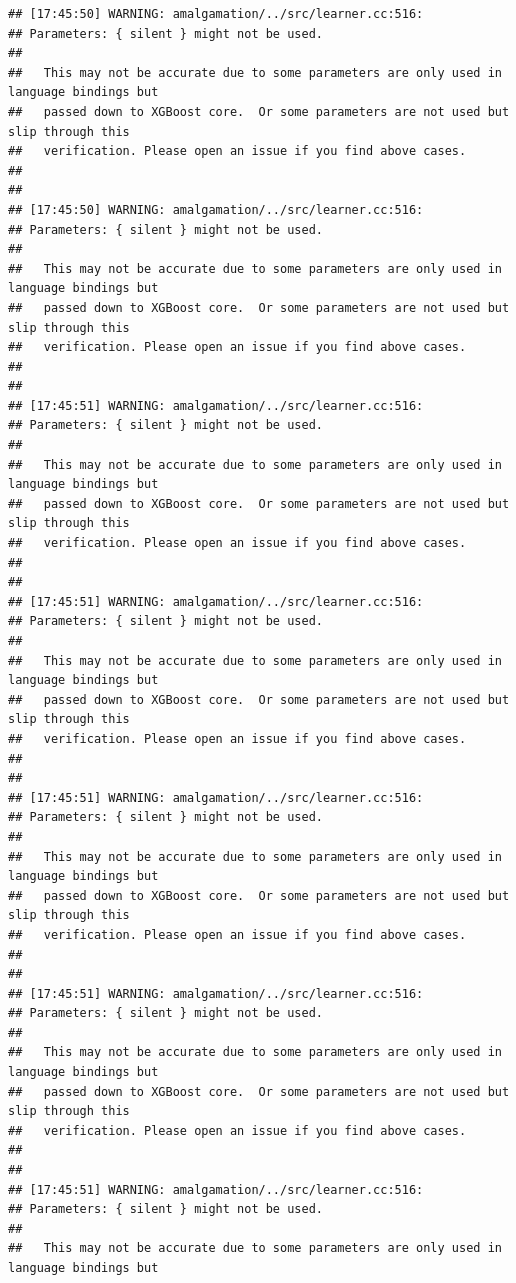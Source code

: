 \documentclass[AMS,STIX2COL]{WileyNJD-v2}\usepackage[]{graphicx}\usepackage[]{color}
\makeatletter
\newenvironment{kframe}{%
 \def\at@end@of@kframe{}%
 \ifinner\ifhmode%
  \def\at@end@of@kframe{\end{minipage}}%
  \begin{minipage}{\columnwidth}%
 \fi\fi%
 \def\FrameCommand##1{\hskip\@totalleftmargin \hskip-\fboxsep
 \colorbox{shadecolor}{##1}\hskip-\fboxsep
     \hskip-\linewidth \hskip-\@totalleftmargin \hskip\columnwidth}%
 \MakeFramed {\advance\hsize-\width
   \@totalleftmargin\z@ \linewidth\hsize
   \@setminipage}}%
 {\par\unskip\endMakeFramed%
 \at@end@of@kframe}
\newenvironment{knitrout}{}{} %
\makeatother
\begin{document}
\begin{knitrout}
\color{fgcolor}\begin{kframe}
\begin{verbatim}
## [17:45:50] WARNING: amalgamation/../src/learner.cc:516: 
## Parameters: { silent } might not be used.
## 
##   This may not be accurate due to some parameters are only used in language bindings but
##   passed down to XGBoost core.  Or some parameters are not used but slip through this
##   verification. Please open an issue if you find above cases.
## 
## 
## [17:45:50] WARNING: amalgamation/../src/learner.cc:516: 
## Parameters: { silent } might not be used.
## 
##   This may not be accurate due to some parameters are only used in language bindings but
##   passed down to XGBoost core.  Or some parameters are not used but slip through this
##   verification. Please open an issue if you find above cases.
## 
## 
## [17:45:51] WARNING: amalgamation/../src/learner.cc:516: 
## Parameters: { silent } might not be used.
## 
##   This may not be accurate due to some parameters are only used in language bindings but
##   passed down to XGBoost core.  Or some parameters are not used but slip through this
##   verification. Please open an issue if you find above cases.
## 
## 
## [17:45:51] WARNING: amalgamation/../src/learner.cc:516: 
## Parameters: { silent } might not be used.
## 
##   This may not be accurate due to some parameters are only used in language bindings but
##   passed down to XGBoost core.  Or some parameters are not used but slip through this
##   verification. Please open an issue if you find above cases.
## 
## 
## [17:45:51] WARNING: amalgamation/../src/learner.cc:516: 
## Parameters: { silent } might not be used.
## 
##   This may not be accurate due to some parameters are only used in language bindings but
##   passed down to XGBoost core.  Or some parameters are not used but slip through this
##   verification. Please open an issue if you find above cases.
## 
## 
## [17:45:51] WARNING: amalgamation/../src/learner.cc:516: 
## Parameters: { silent } might not be used.
## 
##   This may not be accurate due to some parameters are only used in language bindings but
##   passed down to XGBoost core.  Or some parameters are not used but slip through this
##   verification. Please open an issue if you find above cases.
## 
## 
## [17:45:51] WARNING: amalgamation/../src/learner.cc:516: 
## Parameters: { silent } might not be used.
## 
##   This may not be accurate due to some parameters are only used in language bindings but

\end{verbatim}
\end{kframe}
\end{knitrout}
\end{document}
